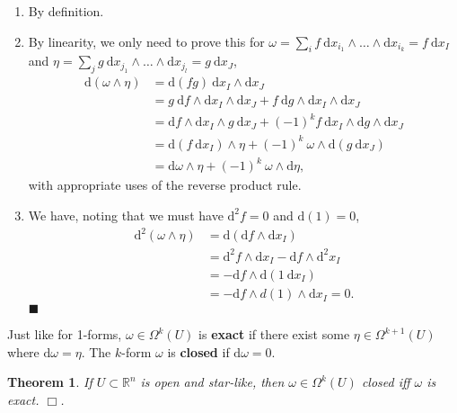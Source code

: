 \documentclass[letter-paper]{tufte-book}
\newtheorem{theorem}{\color{pastel-blue}Theorem}[section]
\newenvironment{proof}[1][Proof]{\begin{trivlist}
\item[\hskip \labelsep {\bfseries #1}]}{\end{trivlist}}
\newcommand{\qed}{\hfill$\blacksquare$}
\newcommand{\qedwhite}{\hfill \ensuremath{\Box}}
\begin{document}
\begin{proof}
  \begin{enumerate}
    \item By definition.
    
    \item By linearity, we only need to prove this for $\omega = \sum_i f\ \mathrm{d}x_{i_1} \wedge \ldots \wedge \mathrm{d}x_{i_k} = f\ \mathrm{d}x_I$ and $\eta = \sum_j g\ \mathrm{d}x_{j_1} \wedge \ldots \wedge \mathrm{d}x_{j_l} = g\ \mathrm{d}x_J$,
    \begin{align*}
      \mathrm{d}(\omega \wedge \eta) 
        &= \mathrm{d}(fg)\ \mathrm{d}x_I \wedge \mathrm{d}x_J \\
        &= g\ \mathrm{d}f \wedge \mathrm{d}x_I \wedge \mathrm{d}x_J + f\ \mathrm{d}g \wedge \mathrm{d}x_I \wedge \mathrm{d}x_J\\
        &= \mathrm{d}f \wedge \mathrm{d}x_I \wedge g\ \mathrm{d}x_J + (-1)^k f\ \mathrm{d}x_I \wedge \mathrm{d}g \wedge \mathrm{d}x_J\\
        &= \mathrm{d}(f\ \mathrm{d}x_I) \wedge \eta + (-1)^k\ \omega \wedge \mathrm{d}(g\ \mathrm{d}x_J)\\
        &= \mathrm{d}\omega \wedge \eta + (-1)^k\ \omega \wedge \mathrm{d}\eta,
    \end{align*}
    with appropriate uses of the reverse product rule.
    
    \item We have, noting that we must have $\mathrm{d}^2 f = 0$ and $\mathrm{d}(1) = 0$,
    \begin{align*}
      \mathrm{d}^2 (\omega \wedge \eta) 
        &= \mathrm{d}(\mathrm{d}f \wedge \mathrm{d}x_I)\\
        &= \mathrm{d}^2 f \wedge \mathrm{d}x_I - \mathrm{d}f \wedge \mathrm{d}^2 x_I\\
        &= -\mathrm{d}f \wedge \mathrm{d}(1\ \mathrm{d}x_I)\\
        &= -\mathrm{d}f \wedge d(1) \wedge \mathrm{d}x_I = 0.
    \end{align*}
    \qed
  \end{enumerate}
\end{proof}

Just like for 1-forms, $\omega \in \Omega^k(U)$ is \textbf{exact} if there exist some $\eta \in \Omega^{k+1}(U)$ where $\mathrm{d}\omega = \eta$. The $k$-form $\omega$ is \textbf{closed} if $\mathrm{d}\omega = 0$.

\begin{theorem}
  If $U \subset \mathbb{R}^n$ is open and star-like, then $\omega \in \Omega^k(U)$ closed iff $\omega$ is exact. \qedwhite.
\end{theorem}
\end{document}
